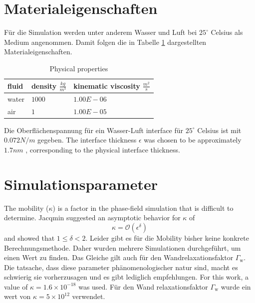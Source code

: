 \section{Materialeigenschaften}
Für die Simulation werden unter anderem Wasser und Luft bei $25^{\circ}$ Celsius als Medium angenommen. Damit folgen die in Tabelle \ref{tab:physicalProperties_CaseSetup} dargestellten Materialeigenschaften. 
\begin{table}[h]
    \centering
    \caption{Physical properties}
    \label{tab:physicalProperties_CaseSetup}
    \begin{tabular}{lll}
    fluid & density $\frac{kg}{m^3}$ & kinematic viscosity $\frac{m^2}{s}$ \\ \hline
    water & $1000$                     & $1.00E-06$                          \\
    air   & $1$                        & $1.00E-05$                          \\ 
    \end{tabular}
    \end{table}
Die Oberflächenspannung für ein Wasser-Luft interface für $25^{\circ}$ Celsius ist mit \(0.072 N/m\) gegeben. The interface thickness \( \epsilon \) was chosen to be approximately \(1.7 nm\) \cite{bagheriInterfacialRelaxationCrucial2022}, corresponding to the physical interface thickness.

\section{Simulationsparameter}
The mobility ($\kappa$) is a factor in the phase-field simulation that is difficult to determine. Jacqmin \cite{jacqmin1999CalculationTwoPhaseNavier} suggested an asymptotic behavior for \( \kappa \) of 
\begin{equation}
    \kappa = \mathcal{O}(\epsilon^{\delta})
\end{equation}
and showed that \( 1 \leq \delta < 2 \). Leider gibt es für die Mobility bisher keine konkrete Berechnungsmethode. Daher wurden mehrere Simulationen durchgeführt, um einen Wert zu finden. Das Gleiche gilt auch für den Wandrelaxationsfaktor $\Gamma_{\mathrm{w}}$. Die tatsache, dass diese parameter phänomenologischer natur sind, macht es schwierig sie vorherzusagen und es gibt lediglich empfehlungen. 
For this work, a value of \( \kappa = 1.6 \times 10^{-18} \) was used. Für den Wand relaxationsfaktor $\Gamma_{\mathrm{w}}$ wurde ein wert von \( \kappa = 5 \times 10^{12} \) verwendet. 

